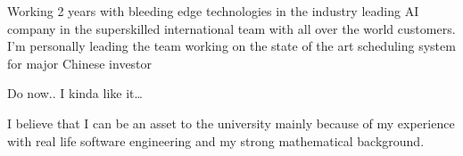 \documentclass[11pt, a4paper]{awesome-cv} %
\begin{document}
\begin{cvletter}
Working 2 years with bleeding edge technologies in the industry leading AI company in the superskilled international team with all over the world customers. I'm personally leading the team working on the state of the art scheduling system for major Chinese investor


Do now.. I kinda like it\ldots



I believe that I can be an asset to the university mainly because of my experience with real life software engineering and my strong mathematical background.


\end{cvletter}


\makeletterclosing %
\end{document}
